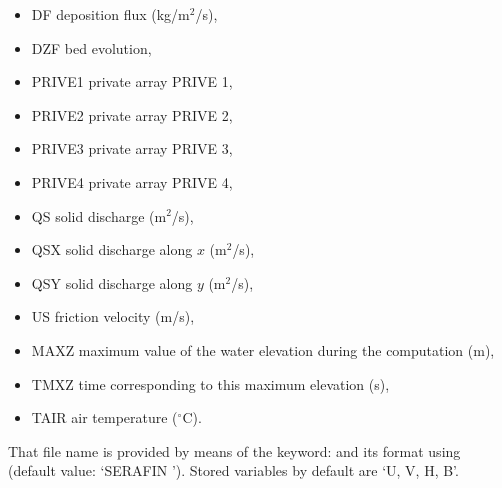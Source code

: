 \begin{itemize}
\item DF deposition flux (kg/m${}^{2}$/s),

\item DZF bed evolution,

\item PRIVE1 private array PRIVE 1,

\item PRIVE2 private array PRIVE 2,

\item PRIVE3 private array PRIVE 3,

\item PRIVE4 private array PRIVE 4,

\item QS  solid discharge (m${}^{2}$/s),

\item QSX  solid discharge along $x$ (m${}^{2}$/s),

\item QSY  solid discharge along $y$ (m${}^{2}$/s),

\item US  friction velocity (m/s),

\item MAXZ  maximum value of the water elevation during the computation (m),

\item TMXZ  time corresponding to this maximum elevation (s),








\item TAIR  air temperature ($^{\circ}$C).
\end{itemize}

That file name is provided by means of the keyword:  and
its format using  (default value: `SERAFIN ').
Stored variables by default are `U, V, H, B'.


